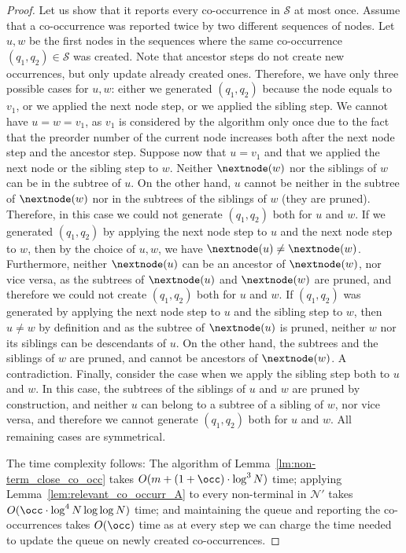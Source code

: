 \begin{proof}
    Let us show that it reports every co-occurrence in $\mathcal{S}$ at most once. Assume that a co-occurrence was reported twice by two different sequences of nodes. 
    Let $u,w$ be the first nodes in the sequences where the same co-occurrence $(q_1,q_2) \in \mathcal{S}$ was created. Note that ancestor steps do not create new occurrences, but only update already created ones. Therefore, we have only three possible cases for $u,w$: either we generated $(q_1,q_2)$ because the node equals to $v_1$, or we applied the next node step, or we applied the sibling step. We cannot have $u = w = v_1$, as $v_1$ is considered by the algorithm only once due to the fact that the preorder number of the current node increases both after the next node step and the ancestor step. Suppose now that $u = v_1$ and that we applied the next node or the sibling step to $w$. Neither $\nextnode(w)$ nor the siblings of $w$ can be in the subtree of $u$. On the other hand, $u$ cannot be neither in the subtree of $\nextnode(w)$ nor in the subtrees of the siblings of $w$ (they are pruned). Therefore, in this case we could not generate $(q_1,q_2)$ both for $u$ and $w$. If we generated $(q_1,q_2)$ by applying the next node step to $u$ and the next node step to $w$, then by the choice of $u,w$, we have $\nextnode(u)\neq \nextnode(w)$. Furthermore, neither $\nextnode(u)$ can be an ancestor of $\nextnode(w)$, nor vice versa, as the subtrees of $\nextnode(u)$ and $\nextnode(w)$ are pruned, and therefore we could not create $(q_1,q_2)$ both for $u$ and $w$. If $(q_1,q_2)$ was generated by applying the next node step to $u$ and the sibling step to $w$, then $u \neq w$ by definition and as the subtree of $\nextnode(u)$ is pruned, neither $w$ nor its siblings can be descendants of $u$. On the other hand, the subtrees and the siblings of $w$ are pruned, and cannot be ancestors of $\nextnode(w)$. A contradiction. Finally, consider the case when we apply the sibling step both to $u$ and $w$. In this case, the subtrees of the siblings of $u$ and $w$ are pruned by construction, and neither $u$ can belong to a subtree of a sibling of $w$, nor vice versa, and therefore we cannot generate $(q_1,q_2)$ both for $u$ and $w$. All remaining cases are symmetrical.  
    
    The time complexity follows: The algorithm of Lemma~\ref{lm:non-term_close_co_occ} takes $O(m +(1+\occ) \cdot \log^3 N)$ time; applying Lemma~\ref{lem:relevant_co_occurr_A} to every non-terminal in $\mathcal{N}'$ takes $O(\occ \cdot \log^{4} N\log\log N)$ time; and maintaining the queue and reporting the co-occurrences takes $O(\occ)$ time as at every step we can charge the time needed to update the queue on newly created co-occurrences. 
\end{proof}
    